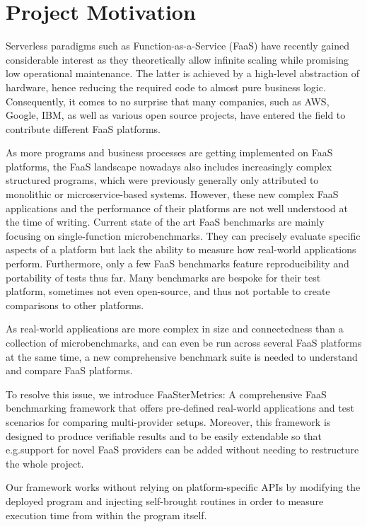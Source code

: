 \documentclass[../main.tex]{subfiles}
\begin{document}
\section{Project Motivation}\label{sec:Intro}

Serverless paradigms such as Function-as-a-Service (FaaS) have recently gained considerable interest 
as they theoretically allow infinite scaling while promising low operational maintenance. 
The latter is achieved by a high-level abstraction of hardware, 
hence reducing the required code to almost pure business logic. 
Consequently, it comes to no surprise that many companies, such as AWS, Google, IBM, 
as well as various open source projects, have entered the field to contribute different FaaS platforms.

As more programs and business processes are getting implemented on FaaS platforms, 
the FaaS landscape nowadays also includes increasingly complex structured programs, 
which were previously generally only attributed to monolithic or microservice-based systems. 
However, these new complex FaaS applications and the performance of their platforms are not well understood at the time of writing. 
Current state of the art FaaS benchmarks are mainly focusing on single-function microbenchmarks. 
They can precisely evaluate specific aspects of a platform but lack the ability to measure how real-world applications perform. 
Furthermore, only a few FaaS benchmarks feature reproducibility and portability of tests thus far. 
Many benchmarks are bespoke for their test platform, sometimes not even open-source, 
and thus not portable to create comparisons to other platforms.

As real-world applications are more complex in size and connectedness than a collection of microbenchmarks, 
and can even be run across several FaaS platforms at the same time, 
a new comprehensive benchmark suite is needed to understand and compare FaaS platforms.

To resolve this issue, we introduce FaaSterMetrics: 
A comprehensive FaaS benchmarking framework that offers pre-defined real-world applications and 
test scenarios for comparing multi-provider setups. 
Moreover, this framework is designed to produce verifiable results and to be easily extendable 
so that e.g.\@ support for novel FaaS providers can be added without needing to restructure the whole project.

Our framework works without relying on platform-specific APIs 
by modifying the deployed program and injecting self-brought routines 
in order to measure execution time from within the program itself.
\end{document}
